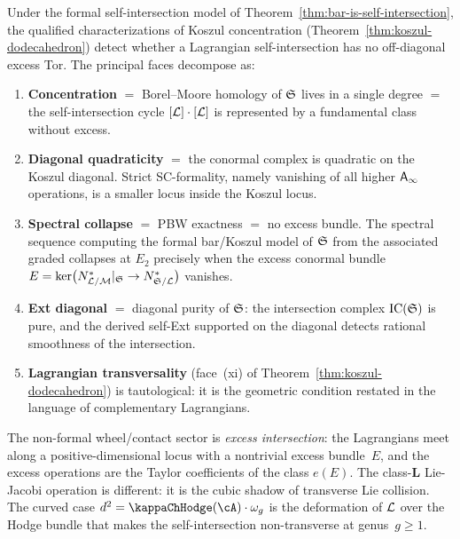 \begin{corollary}
\label{cor:dodecahedron-lagrangian-singularity}
Under the formal self-intersection model of
Theorem~\textup{\ref{thm:bar-is-self-intersection}}, the qualified
characterizations of Koszul concentration
\textup{(}Theorem~\textup{\ref{thm:koszul-dodecahedron}}\textup{)}
detect whether a Lagrangian self-intersection has no off-diagonal
excess Tor. The principal faces decompose as:
\begin{enumerate}[label=\textup{(\roman*)},leftmargin=2em]
\item \textbf{Concentration} $=$ Borel--Moore homology of
 $\mathfrak{S}$ lives in a single degree $=$ the self-intersection
 cycle $[\mathcal L] \cdot [\mathcal L]$ is represented by a fundamental class
 without excess.
\item \textbf{Diagonal quadraticity} $=$ the conormal complex is
 quadratic on the Koszul diagonal. Strict SC-formality, namely
 vanishing of all higher $\mathsf{A}_{\infty}$ operations, is a smaller locus inside
 the Koszul locus.
\item \textbf{Spectral collapse} $=$ PBW exactness $=$ no excess
 bundle. The spectral sequence computing
 the formal bar/Koszul model of $\mathfrak{S}$ from the associated
 graded collapses at $E_2$
 precisely when the excess conormal bundle
 $E = \ker\bigl(N^*_{\mathcal L/\mathcal M}|_{\mathfrak{S}} \to N^*_{\mathfrak{S}/\mathcal L}\bigr)$
 vanishes.
\item \textbf{Ext diagonal} $=$ diagonal purity of $\mathfrak{S}$:
 the intersection complex $\mathrm{IC}(\mathfrak{S})$ is pure,
 and the derived self-Ext supported on the diagonal detects
 rational smoothness of the intersection.
\item \textbf{Lagrangian transversality}
 \textup{(}face~\textup{(xi)} of
 Theorem~\textup{\ref{thm:koszul-dodecahedron}}\textup{)} is
 tautological: it is the geometric condition restated in
 the language of complementary Lagrangians.
\end{enumerate}
The non-formal wheel/contact sector is \emph{excess intersection}: the
Lagrangians meet along a positive-dimensional locus with a nontrivial
excess bundle~$E$, and the excess operations are the Taylor
coefficients of the class $e(E)$. The class-$\mathbf L$ Lie-Jacobi
operation is different: it is the cubic shadow of transverse Lie
collision. The curved case $d^2 = \kappaChHodge(\cA)\cdot\omega_g$ is the
deformation of $\mathcal L$ over the Hodge bundle that makes the
self-intersection non-transverse at genus~$g \geq 1$.
\end{corollary}


